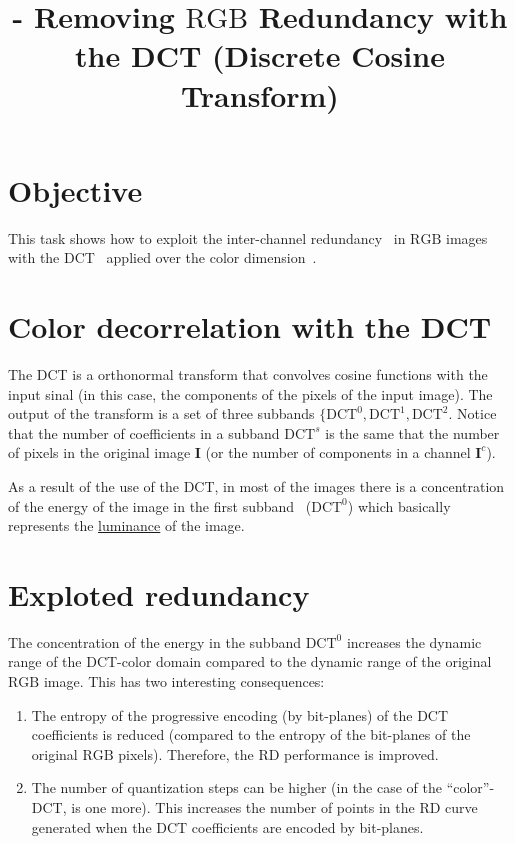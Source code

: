 

\title{\SM{} - Removing $\text{RGB}$ Redundancy with the DCT (Discrete Cosine Transform)}

\maketitle
\tableofcontents

\section{Objective}
This task shows how to exploit the inter-channel
redundancy~\cite{vruiz__visual_redundancy,vruiz__information_theory}
in $\text{RGB}$ images with the DCT~\cite{vruiz__DCT} applied over the
color dimension~\cite{vruiz__image_IO}.

\section{Color decorrelation with the DCT}
The DCT is a orthonormal transform that convolves cosine functions
with the input sinal (in this case, the components of the pixels of
the input image). The output of the transform is a set of three
subbands $\{\text{DCT}^0, \text{DCT}^1, \text{DCT}^2$. Notice that the
number of coefficients in a subband $\text{DCT}^s$ is the same that
the number of pixels in the original image $\mathbf{I}$ (or the number
of components in a channel $\mathbf{I}^c$).

As a result of the use of the DCT, in most of the images there is a
concentration of the energy of the image in the first
subband~\cite{vruiz__transform_coding} ($\text{DCT}^0$) which
basically represents the
\href{https://en.wikipedia.org/wiki/Luminance}{luminance} of the
image.

\section{Exploted redundancy}
The concentration of the energy in the subband $\text{DCT}^0$
increases the dynamic range of the DCT-color domain compared to the
dynamic range of the original $\text{RGB}$ image. This has two
interesting consequences:
\begin{enumerate}
\item The entropy of the progressive encoding (by bit-planes) of the
  DCT coefficients is reduced (compared to the entropy of the
  bit-planes of the original $\text{RGB}$ pixels). Therefore, the RD
  performance is improved.
\item The number of quantization steps can be higher (in the case of
  the ``color''-DCT, is one more). This increases the number of points
  in the RD curve generated when the DCT coefficients are encoded by
  bit-planes.
\end{enumerate}

